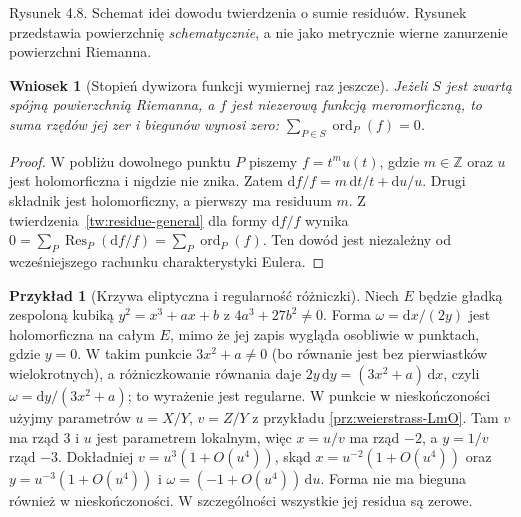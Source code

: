 \documentclass[11pt,a4paper,openany]{report}
\numberwithin{equation}{section}
\theoremstyle{plain}
\newtheorem{wniosek}[twierdzenie]{Wniosek}
\theoremstyle{definition}
\newtheorem{przyklad}[twierdzenie]{Przykład}
\theoremstyle{remark}
\newcommand{\Z}{\mathbb Z}
\begin{document}
\begin{center}

{\small Rysunek 4.8. Schemat idei dowodu twierdzenia o sumie residuów.
Rysunek przedstawia powierzchnię \emph{schematycznie}, a nie jako
metrycznie wierne zanurzenie powierzchni Riemanna.}
\end{center}

\begin{wniosek}[Stopień dywizora funkcji wymiernej raz jeszcze]
Jeżeli $S$ jest zwartą spójną powierzchnią
Riemanna, a $f$ jest niezerową funkcją meromorficzną,
to suma rzędów jej zer i biegunów wynosi zero:
$\sum_{P\in S}\operatorname{ord}_P(f)=0$.
\end{wniosek}
\begin{proof}
W pobliżu dowolnego punktu $P$ piszemy
$f=t^mu(t)$, gdzie $m\in\Z$ oraz $u$ jest
holomorficzna i nigdzie nie znika. Zatem
$\mathrm df/f=m\,\mathrm dt/t+\mathrm du/u$.
Drugi składnik jest holomorficzny, a pierwszy
ma residuum $m$. Z twierdzenia~\ref{tw:residue-general}
dla formy $\mathrm df/f$ wynika
$0=\sum_P\operatorname{Res}_P(\mathrm df/f)
=\sum_P\operatorname{ord}_P(f)$.
Ten dowód jest niezależny od wcześniejszego
rachunku charakterystyki Eulera.
\end{proof}

\begin{przyklad}[Krzywa eliptyczna i regularność różniczki]
Niech $E$ będzie gładką zespoloną kubiką
$y^2=x^3+ax+b$ z $4a^3+27b^2\ne0$.
Forma $\omega=\mathrm dx/(2y)$ jest holomorficzna
na całym $E$, mimo że jej zapis wygląda osobliwie
w punktach, gdzie $y=0$. W takim punkcie
$3x^2+a\ne0$ (bo równanie jest bez pierwiastków
wielokrotnych), a różniczkowanie równania daje
$2y\,\mathrm dy=(3x^2+a)\,\mathrm dx$, czyli
$\omega=\mathrm dy/(3x^2+a)$; to wyrażenie jest
regularne. W punkcie w nieskończoności użyjmy
parametrów $u=X/Y$, $v=Z/Y$ z przykładu
\ref{prz:weierstrass-LmO}. Tam $v$ ma rząd $3$
i $u$ jest parametrem lokalnym, więc
$x=u/v$ ma rząd $-2$, a $y=1/v$ rząd $-3$.
Dokładniej $v=u^3(1+O(u^4))$, skąd
$x=u^{-2}(1+O(u^4))$ oraz
$y=u^{-3}(1+O(u^4))$ i
$\omega=(-1+O(u^4))\,\mathrm du$.
Forma nie ma bieguna również w nieskończoności.
W szczególności wszystkie jej residua są zerowe.
\end{przyklad}
\end{document}
